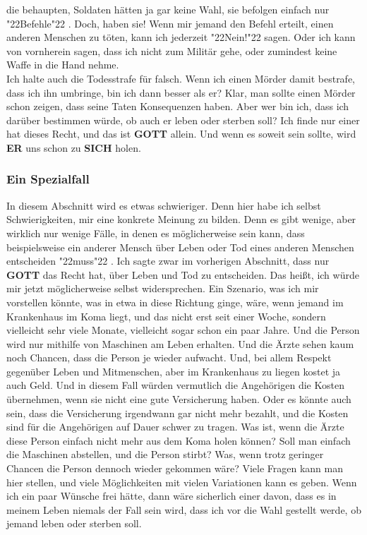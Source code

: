 \documentclass[10pt,a5paper]{article}
\newcommand{\Er}[0]{\textbf{ER}}
\newcommand{\Gott}[0]{\textbf{GOTT}}
\newcommand{\Sich}[0]{\textbf{SICH}}
\newcommand{\q}[1]{\char"22{#1}\char"22 }
\begin{document}
		die behaupten,
		Soldaten h\"atten ja gar keine Wahl,
		sie befolgen einfach nur \q{Befehle}.
		Doch, haben sie!
		Wenn mir jemand den Befehl erteilt,
		einen anderen Menschen zu t\"oten,
		kann ich jederzeit \q{Nein!} sagen.
		Oder ich kann von vornherein sagen,
		dass ich nicht zum Milit\"ar gehe,
		oder zumindest keine Waffe in die Hand nehme.
		\\
		Ich halte auch die Todesstrafe f\"ur falsch.
		Wenn ich einen M\"order damit bestrafe,
		dass ich ihn umbringe,
		bin ich dann besser als er?
		Klar,
		man sollte einen M\"order schon zeigen,
		dass seine Taten Konsequenzen haben.
		Aber wer bin ich,
		dass ich dar\"uber bestimmen w\"urde,
		ob auch er leben oder sterben soll?
		Ich finde nur einer hat dieses Recht,
		und das ist {\Gott} allein.
		Und wenn es soweit sein sollte,
		wird {\Er} uns schon zu {\Sich} holen.
		
	\subsubsection{Ein Spezialfall}
		In diesem Abschnitt wird es etwas schwieriger.
		Denn hier habe ich selbst Schwierigkeiten,
		mir eine konkrete Meinung zu bilden.
		Denn es gibt wenige,
		aber wirklich nur wenige F\"alle,
		in denen es m\"oglicherweise sein kann,
		dass beispielsweise ein anderer Mensch \"uber Leben oder Tod eines anderen Menschen entscheiden \q{muss}.
		Ich sagte zwar im vorherigen Abschnitt,
		dass nur {\Gott} das Recht hat,
		\"uber Leben und Tod zu entscheiden.
		Das hei{\ss}t,
		ich w\"urde mir jetzt m\"oglicherweise selbst widersprechen.
		Ein Szenario,
		was ich mir vorstellen k\"onnte,
		was in etwa in diese Richtung ginge,
		w\"are,
		wenn jemand im Krankenhaus im Koma liegt,
		und das nicht erst seit einer Woche,
		sondern vielleicht sehr viele Monate,
		vielleicht sogar schon ein paar Jahre.
		Und die Person wird nur mithilfe von Maschinen am Leben erhalten.
		Und die \"Arzte sehen kaum noch Chancen,
		dass die Person je wieder aufwacht.
		Und,
		bei allem Respekt gegen\"uber Leben und Mitmenschen,
		aber im Krankenhaus zu liegen kostet ja auch Geld.
		Und in diesem Fall w\"urden vermutlich die Angeh\"origen die Kosten \"ubernehmen,
		wenn sie nicht eine gute Versicherung haben.
		Oder es k\"onnte auch sein,
		dass die Versicherung irgendwann gar nicht mehr bezahlt,
		und die Kosten sind f\"ur die Angeh\"origen auf Dauer schwer zu tragen.
		Was ist,
		wenn die \"Arzte diese Person einfach nicht mehr aus dem Koma holen k\"onnen?
		Soll man einfach die Maschinen abstellen,
		und die Person stirbt?
		Was,
		wenn trotz geringer Chancen die Person dennoch wieder gekommen w\"are?
		Viele Fragen kann man hier stellen,
		und viele M\"oglichkeiten mit vielen Variationen kann es geben.
		Wenn ich ein paar W\"unsche frei h\"atte,
		dann w\"are sicherlich einer davon,
		dass es in meinem Leben niemals der Fall sein wird,
		dass ich vor die Wahl gestellt werde,
		ob jemand leben oder sterben soll.
		
\end{document}
